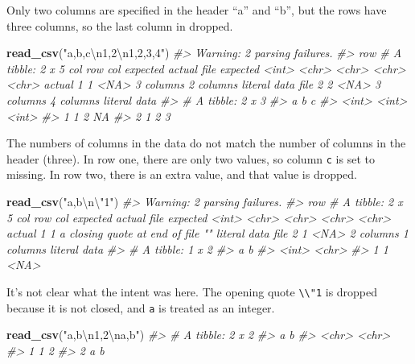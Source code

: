\documentclass[]{book}
\newenvironment{Shaded}{\begin{snugshade}}{\end{snugshade}}
\newcommand{\CharTok}[1]{\textcolor[rgb]{0.31,0.60,0.02}{#1}}
\newcommand{\CommentTok}[1]{\textcolor[rgb]{0.56,0.35,0.01}{\textit{#1}}}
\newcommand{\KeywordTok}[1]{\textcolor[rgb]{0.13,0.29,0.53}{\textbf{#1}}}
\newcommand{\NormalTok}[1]{#1}
\newcommand{\StringTok}[1]{\textcolor[rgb]{0.31,0.60,0.02}{#1}}
\theoremstyle{plain}
\theoremstyle{remark}
\theoremstyle{definition}
\theoremstyle{definition}
\theoremstyle{definition}
\theoremstyle{remark}
\begin{document}
Only two columns are specified in the header ``a'' and ``b'', but the
rows have three columns, so the last column in dropped.

\begin{Shaded}
\begin{Highlighting}[]
\KeywordTok{read_csv}\NormalTok{(}\StringTok{"a,b,c}\CharTok{\textbackslash{}n}\StringTok{1,2}\CharTok{\textbackslash{}n}\StringTok{1,2,3,4"}\NormalTok{)}
\CommentTok{#> Warning: 2 parsing failures.}
\CommentTok{#> row # A tibble: 2 x 5 col     row col   expected  actual    file         expected   <int> <chr> <chr>     <chr>     <chr>        actual 1     1 <NA>  3 columns 2 columns literal data file 2     2 <NA>  3 columns 4 columns literal data}
\CommentTok{#> # A tibble: 2 x 3}
\CommentTok{#>       a     b     c}
\CommentTok{#>   <int> <int> <int>}
\CommentTok{#> 1     1     2    NA}
\CommentTok{#> 2     1     2     3}
\end{Highlighting}
\end{Shaded}

The numbers of columns in the data do not match the number of columns in
the header (three). In row one, there are only two values, so column
\texttt{c} is set to missing. In row two, there is an extra value, and
that value is dropped.

\begin{Shaded}
\begin{Highlighting}[]
\KeywordTok{read_csv}\NormalTok{(}\StringTok{"a,b}\CharTok{\textbackslash{}n\textbackslash{}"}\StringTok{1"}\NormalTok{)}
\CommentTok{#> Warning: 2 parsing failures.}
\CommentTok{#> row # A tibble: 2 x 5 col     row col   expected                     actual    file         expected   <int> <chr> <chr>                        <chr>     <chr>        actual 1     1 a     closing quote at end of file ""        literal data file 2     1 <NA>  2 columns                    1 columns literal data}
\CommentTok{#> # A tibble: 1 x 2}
\CommentTok{#>       a b    }
\CommentTok{#>   <int> <chr>}
\CommentTok{#> 1     1 <NA>}
\end{Highlighting}
\end{Shaded}

It's not clear what the intent was here. The opening quote
\texttt{\textbackslash{}\textbackslash{}"1} is dropped because it is not
closed, and \texttt{a} is treated as an integer.

\begin{Shaded}
\begin{Highlighting}[]
\KeywordTok{read_csv}\NormalTok{(}\StringTok{"a,b}\CharTok{\textbackslash{}n}\StringTok{1,2}\CharTok{\textbackslash{}n}\StringTok{a,b"}\NormalTok{)}
\CommentTok{#> # A tibble: 2 x 2}
\CommentTok{#>   a     b    }
\CommentTok{#>   <chr> <chr>}
\CommentTok{#> 1 1     2    }
\CommentTok{#> 2 a     b}
\end{Highlighting}
\end{Shaded}
\end{document}
